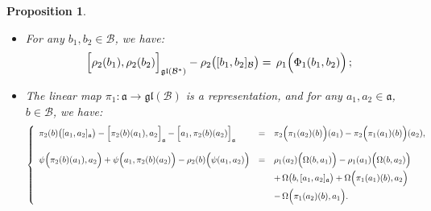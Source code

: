 \documentclass[final,1p,times,nopreprintline]{elsarticle}
\newtheorem{proposition}{Proposition}[section]
\theoremstyle{definition}
\numberwithin{equation}{section}
\newcommand{\ai}{\mathfrak{a}}
\numberwithin{equation}{section}
\newcommand{\gl}{\mathfrak{gl}}
\newcommand{\bi}{\mathcal{B}}
\begin{document}
\begin{proposition}
\begin{itemize}
\begin{equation*}
\begin{array}{r c l}
\psi\Big(a,\Phi_1(b_1,b_2)\Big)+\rho_2(b_1)\Big(\Omega(b_2,a)\Big)-\rho_2(b_2)\Big(\Omega(b_1,a)\Big)&=&\Phi_2\Big(\pi_1(a)(b_1),b_2\Big)+\Phi_2\Big(b_1,\pi_1(a)(b_2)\Big)\hfill\\\vspace{1mm}
&&-\,\rho_1(a)\Big(\Phi_2(b_1,b_2)\Big)+\Omega\big([b_1,b_2]_\bi,a\big)\\
&&-\,\Omega\Big(b_1,\pi_2(b_2)(a)\Big)+\Omega\Big(b_2,\pi_2(b_1)(a)\Big)\,;
\end{array}
\right.
\end{equation*}
\item[$(\textnormal{C$4$})$] For any $b_1,b_2\in\bi$, we have:\vspace{1mm}
\begin{equation*}
\Big[\rho_2(b_1),\rho_2(b_2)\Big]_{\gl(\bi^*)}-\rho_2\big([b_1,b_2]_\bi\big)=\,\rho_1\Big(\Phi_1(b_1,b_2)\Big)\,;\vspace{1mm}
\end{equation*}
\item[$(\textnormal{C$5$})$] The linear map $\pi_1:\ai\to\gl(\bi)$ is a representation, and for any $a_1,a_2\in\ai$, $b\in\bi$, we have:\vspace{1mm}
\begin{equation*}
\left\{
\begin{array}{r c l} \pi_2(b)\big([a_1,a_2]_\ai\big)-\Big[\pi_2(b)(a_1),a_2\Big]_\ai-\Big[a_1,\pi_2(b)(a_2)\Big]_\ai\hfill&=&\pi_2\Big(\pi_1(a_2)(b)\Big)(a_1)-\pi_2\Big(\pi_1(a_1)(b)\Big)(a_2),\\\\\vspace{1mm}
\psi\Big(\pi_2(b)(a_1),a_2\Big)+\psi\Big(a_1,\pi_2(b)(a_2)\Big)-\rho_2(b)\Big(\psi(a_1,a_2)\Big)&=&\rho_1(a_2)\Big(\Omega(b,a_1)\Big)-\rho_1(a_1)\Big(\Omega(b,a_2)\Big)\\\vspace{1mm}
&&+\,\Omega\big(b,[a_1,a_2]_\ai\big)+\Omega\Big(\pi_1(a_1)(b),a_2\Big)\\
&&-\,\Omega\Big(\pi_1(a_2)(b),a_1\Big).
	\end{array}
	\right.
\end{equation*}
\end{itemize}
\end{proposition}
\end{document}
